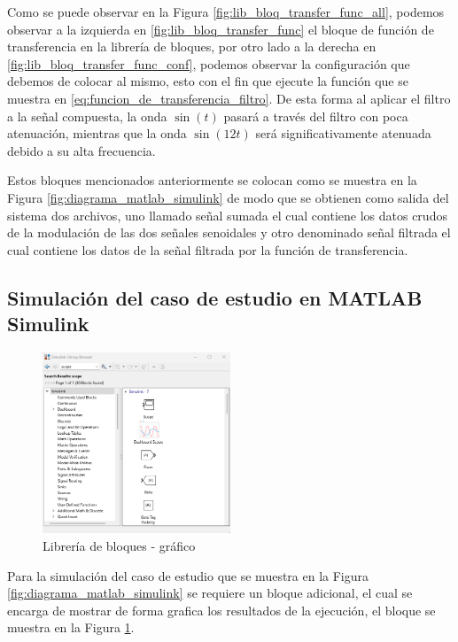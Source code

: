 Como se puede observar en la Figura \ref{fig:lib_bloq_transfer_func_all}, podemos observar a la izquierda en \ref{fig:lib_bloq_transfer_func} el bloque de función de transferencia en la librería de bloques, por otro lado a la derecha en \ref{fig:lib_bloq_transfer_func_conf}, podemos observar la configuración que debemos de colocar al mismo, esto con el fin que ejecute la función que se muestra en \ref{eq:funcion_de_transferencia_filtro}. De esta forma al aplicar el filtro a la señal compuesta,  la onda $\sin(t)$ pasará a través del filtro con poca atenuación, mientras que la onda $\sin(12t)$ será significativamente atenuada debido a su  alta frecuencia.

Estos bloques mencionados anteriormente se colocan como se muestra en la Figura \ref{fig:diagrama_matlab_simulink} de modo que se obtienen como salida del sistema dos archivos, uno llamado señal sumada el cual contiene los datos crudos de la modulación de las dos señales senoidales y otro denominado señal filtrada el cual contiene los datos de la señal filtrada por la función de transferencia.

\newpage

\subsection{Simulación del caso de estudio en MATLAB Simulink}\label{subsec:simulacion_caso_de_estudio}

\begin{figure}[h!]
    \centering
    \includegraphics[width=0.5\textwidth]{fig/especifico_2/CASO_ESTUDIO_FILTRO/scope_0.png}
    \caption{Librería de bloques - gráfico}
    \label{fig:lib_bloq_graph}
\end{figure}

Para la simulación del caso de estudio que se muestra en la Figura \ref{fig:diagrama_matlab_simulink} se requiere un bloque adicional, el cual se encarga de mostrar de forma grafica los resultados de la ejecución, el bloque se muestra en la Figura \ref{fig:lib_bloq_graph}.

